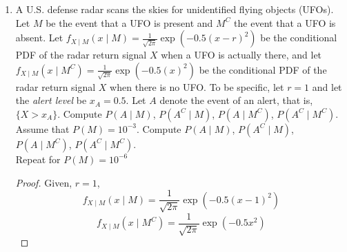 \documentclass[paper=usletter, fontsize=12pt]{article}
\begin{document}
\begin{enumerate}
\begin{proof}
            And,
            \begin{align*}
                f_Y(y) & = \int_{\infty}f_{X,Y}(x,y)\diff{x}\\
                & = \int_{\infty}f_{Y \mid X}(y \mid x)f_X(x)\diff{x}\\
                & = \int_{-1}^{1}\frac{1}{2}\frac{1}{\sqrt{2\pi\sigma^2}}\exp\Big(\frac{-(y-x)^2}{2\sigma^2}\Big)\diff{x}\\
                & = \frac{1}{2}\bigg(\phi\Big(\frac{y-1}{\sigma}\Big)-\phi\Big(\frac{y+1}{\sigma}\Big)\bigg)
            \end{align*}
            \endgroup

            Therefore,
            \begin{align*}
                f_{X \mid Y}(x \mid y) & = \frac{f_{Y \mid X}(y \mid x)f_X(x)}{f_Y(y)}\\
                & = \frac{\frac{1}{\sqrt{2\pi\sigma^2}}\exp\Big(\frac{-(y-x)^2}{2\sigma^2}\Big)f_X(x)}{\phi\Big(\frac{y-1}{\sigma}\Big)-\phi\Big(\frac{y+1}{\sigma}\Big)} \qedhere
            \end{align*}
            \endgroup

        \end{proof}

        \item A U.S. defense radar scans the skies for unidentified flying
        objects (UFOs). Let $M$ be the event that a UFO is present and $M^C$
        the event that a UFO is absent. Let $f_{X \mid M}(x \mid
        M)=\frac{1}{\sqrt{2\pi}}\exp(-0.5(x-r)^2)$ be the conditional PDF of
        the radar return signal $X$ when a UFO is actually there, and let $f_{X
        \mid M}(x \mid M^C)=\frac{1}{\sqrt{2\pi}}\exp(-0.5(x)^2)$ be the
        conditional PDF of the radar return signal $X$ when there is no UFO. To
        be specific, let $r=1$ and let the \textit{alert level} be $x_A=0.5$.
        Let $A$ denote the event of an alert, that is, $\{X>x_A\}$. Compute
        $P(A\mid M)$, $P(A^C\mid M)$, $P(A\mid M^C)$, $P(A^C\mid M^C)$.\\
        Assume that $P(M)=10^{-3}$. Compute $P(A\mid M)$, $P(A^C\mid M)$,
        $P(A\mid M^C)$, $P(A^C\mid M^C)$.\\
        Repeat for $P(M)=10^{-6}$
        \begin{proof}

            Given, $r=1$,
            \begin{equation*}
                f_{X \mid M}(x \mid M)=\frac{1}{\sqrt{2\pi}}\exp(-0.5(x-1)^2)
            \end{equation*}
            \begin{equation*}
                f_{X \mid M}(x \mid M^C)=\frac{1}{\sqrt{2\pi}}\exp(-0.5x^2)
            \end{equation*}

        \end{proof}

    \end{enumerate}
\end{document}
